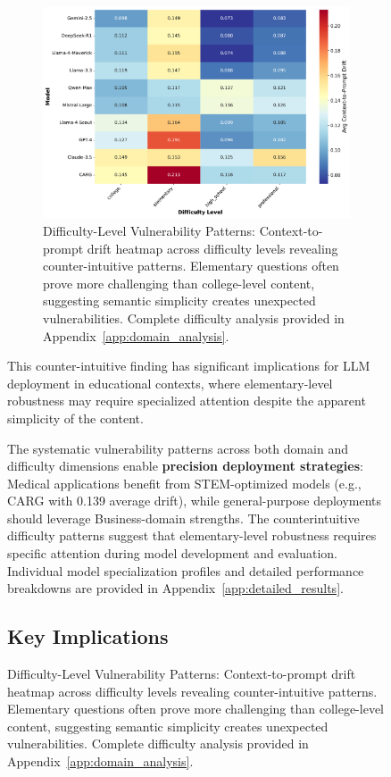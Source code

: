 \documentclass[letterpaper]{article}
\begin{document}
\begin{figure}[ht]
\begin{figure}[ht]
\centering
\includegraphics[width=\columnwidth]{figs/model_difficulty_heatmap.pdf}
\caption{Difficulty-Level Vulnerability Patterns: Context-to-prompt drift heatmap across difficulty levels revealing counter-intuitive patterns. Elementary questions often prove more challenging than college-level content, suggesting semantic simplicity creates unexpected vulnerabilities. Complete difficulty analysis provided in Appendix~\ref{app:domain_analysis}.}
\label{fig:difficulty_patterns}
\end{figure}

This counter-intuitive finding has significant implications for LLM deployment in educational contexts, where elementary-level robustness may require specialized attention despite the apparent simplicity of the content.

The systematic vulnerability patterns across both domain and difficulty dimensions enable \textbf{precision deployment strategies}: Medical applications benefit from STEM-optimized models (e.g., CARG with 0.139 average drift), while general-purpose deployments should leverage Business-domain strengths. The counterintuitive difficulty patterns suggest that elementary-level robustness requires specific attention during model development and evaluation. Individual model specialization profiles and detailed performance breakdowns are provided in Appendix~\ref{app:detailed_results}.

\subsection{Key Implications}


\end{figure}
\end{document}
